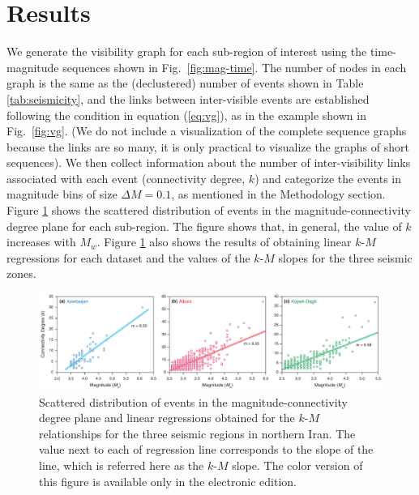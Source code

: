 
\section{Results}

We generate the visibility graph for each sub-region of interest using the time-magnitude sequences shown in Fig.~\ref{fig:mag-time}. The number of nodes in each graph is the same as the (declustered) number of events shown in Table \ref{tab:seismicity}, and the links between inter-visible events are established following the condition in equation (\ref{eq:vg}), as in the example shown in Fig.~\ref{fig:vg}. (We do not include a visualization of the complete sequence graphs because the links are so many, it is only practical to visualize the graphs of short sequences). We then collect information about the number of inter-visibility links associated with each event (connectivity degree, $k$) and categorize the events in magnitude bins of size $\Delta M = 0.1$, as mentioned in the Methodology section. Figure \ref{fig:km} shows the scattered distribution of events in the magnitude-connectivity degree plane for each sub-region. The figure shows that, in general, the value of $k$ increases with $M_w$. Figure \ref{fig:km} also shows the results of obtaining linear $k$-$M$ regressions for each dataset and the values of the $k$-$M$ slopes for the three seismic zones.

\begin{figure}[t]
	\centering
	\includegraphics[width=\textwidth]{figures/pdf/figure-06} 
	\caption{Scattered distribution of events in the magnitude-connectivity degree plane and linear regressions obtained for the $k$-$M$ relationships for the three seismic regions in northern Iran. The value next to each of regression line corresponds to the slope of the line, which is referred here as the $k$-$M$ slope. The color version of this figure is available only in the electronic edition.}
	\label{fig:km}
\end{figure}

